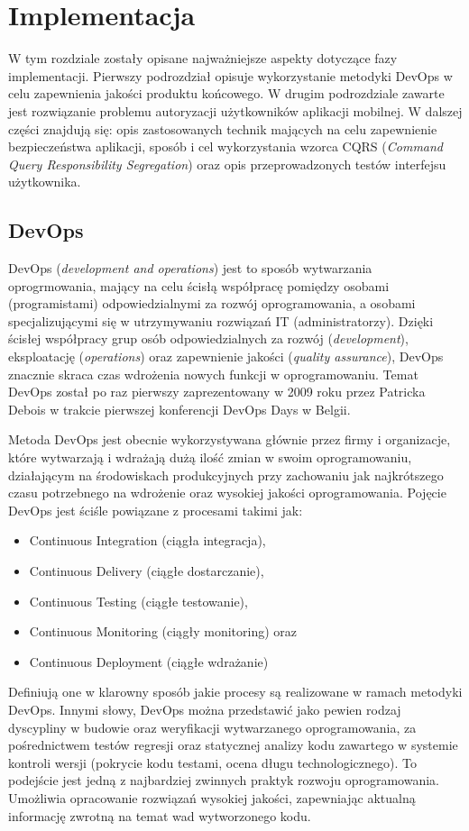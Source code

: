 \chapter{Implementacja}
W tym rozdziale zostały opisane najważniejsze aspekty dotyczące fazy implementacji. Pierwszy podrozdział opisuje wykorzystanie metodyki DevOps w celu zapewnienia jakości produktu końcowego. W drugim podrozdziale zawarte jest rozwiązanie problemu autoryzacji użytkowników aplikacji mobilnej. W dalszej części znajdują się: opis zastosowanych technik mających na celu zapewnienie bezpieczeństwa aplikacji, sposób i cel wykorzystania wzorca CQRS (\textit{Command Query Responsibility Segregation}) oraz opis przeprowadzonych testów interfejsu użytkownika.
\section{DevOps}
DevOps (\textit{development and operations}) jest to sposób wytwarzania oprogrmowania, mający na celu ścisłą współpracę pomiędzy osobami (programistami) odpowiedzialnymi za rozwój oprogramowania, a osobami specjalizującymi się w utrzymywaniu rozwiązań IT (administratorzy). Dzięki ścisłej współpracy grup osób odpowiedzialnych za rozwój (\textit{development}), eksploatację (\textit{operations}) oraz zapewnienie jakości (\textit{quality assurance}), DevOps znacznie skraca czas wdrożenia nowych funkcji w oprogramowaniu. Temat DevOps został po raz pierwszy zaprezentowany w 2009 roku przez Patricka Debois w trakcie pierwszej konferencji DevOps Days w Belgii. \cite{RefWorks:2}\cite{Czymjest19:online}

Metoda DevOps jest obecnie wykorzystywana głównie przez firmy i organizacje, które wytwarzają i wdrażają dużą ilość zmian w swoim oprogramowaniu, działającym na środowiskach produkcyjnych przy zachowaniu jak najkrótszego czasu potrzebnego na wdrożenie oraz wysokiej jakości oprogramowania. \cite{Devopsco42:online}
\newpage
Pojęcie DevOps jest ściśle powiązane z procesami takimi jak:
\begin{itemize}
\item Continuous Integration (ciągła integracja),
\item Continuous Delivery (ciągłe dostarczanie),
\item Continuous Testing (ciągłe testowanie),
\item Continuous Monitoring (ciągły monitoring) oraz
\item Continuous Deployment (ciągłe wdrażanie)
\end{itemize}
Definiują one w klarowny sposób jakie procesy są realizowane w ramach metodyki DevOps. Innymi słowy, DevOps można przedstawić jako pewien rodzaj dyscypliny w budowie oraz weryfikacji wytwarzanego oprogramowania, za pośrednictwem testów regresji oraz statycznej analizy kodu zawartego w systemie kontroli wersji (pokrycie kodu testami, ocena długu technologicznego). To podejście jest jedną z najbardziej zwinnych praktyk rozwoju oprogramowania. Umożliwia opracowanie rozwiązań wysokiej jakości, zapewniając aktualną informację zwrotną na temat wad wytworzonego kodu. \cite{Devopsco42:online}

